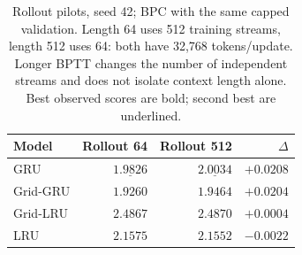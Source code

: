 \begin{table}[H]
\centering
\caption{Rollout pilots, seed 42; BPC with the same capped validation. Length 64 uses 512 training streams, length 512 uses 64: both have 32,768 tokens/update. Longer BPTT changes the number of independent streams and does not isolate context length alone. Best observed scores are bold; second best are underlined.}
\label{tab:rollout}
\begin{tabular}{lrrr}
\toprule
Model & Rollout 64 & Rollout 512 & $\Delta$ \\
\midrule
GRU & $\underline{1.9826}$ & $\underline{2.0034}$ & $+0.0208$ \\
Grid-GRU & $\mathbf{1.9260}$ & $\mathbf{1.9464}$ & $+0.0204$ \\
Grid-LRU & $2.4867$ & $2.4870$ & $+0.0004$ \\
LRU & $2.1575$ & $2.1552$ & $-0.0022$ \\
\bottomrule
\end{tabular}
\end{table}
